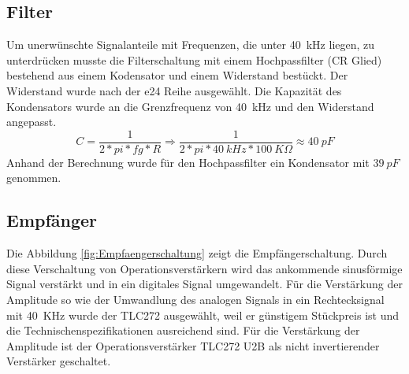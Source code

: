 \subsection{Filter}%
Um unerwünschte Signalanteile mit Frequenzen, die unter 40~kHz liegen, zu unterdrücken musste die Filterschaltung mit einem Hochpassfilter (CR Glied) bestehend aus einem Kodensator und einem Widerstand bestückt. Der Widerstand wurde nach der e24 Reihe ausgewählt.
Die Kapazität des Kondensators wurde an die Grenzfrequenz von 40~kHz und den Widerstand angepasst.
\onehalfspacing \\
\[\displaystyle C=\frac{1}{2*pi*fg*R}\Rightarrow\frac{1}{2*pi*40~kHz*100~K\Omega}\approx40~pF \]
\singlespacing
Anhand der Berechnung wurde für den Hochpassfilter ein Kondensator mit \(\displaystyle 39~pF\) genommen.

\subsection{Empfänger}
Die Abbildung \ref{fig:Empfaengerschaltung} zeigt die Empfängerschaltung. Durch diese Verschaltung von Operationsverstärkern wird das ankommende sinusförmige Signal verstärkt und in ein digitales Signal umgewandelt. 
Für die Verstärkung der Amplitude so wie der Umwandlung des analogen Signals in ein Rechtecksignal mit 40~KHz wurde der TLC272 ausgewählt, weil er günstigem Stückpreis ist und die Technischenspezifikationen ausreichend sind.
Für die Verstärkung der Amplitude ist der Operationsverstärker TLC272 U2B als nicht invertierender Verstärker geschaltet.\\

